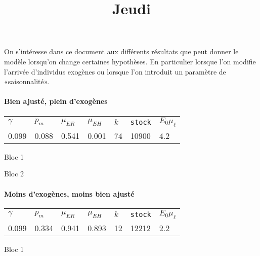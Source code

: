 \documentclass[a4paper, 11pt]{article}
\title{Jeudi}
\author{}
\date{}
\begin{document}
 \maketitle 
 
 On s'intéresse dans ce document aux différents résultats que peut donner le modèle lorsqu'on change certaines hypothèses.
 En particulier lorsque l'on modifie l'arrivée d'individus exogènes ou lorsque l'on introduit un paramètre de «saisonnalité».
 
 \paragraph{Bien ajusté, plein d'exogènes}
 
 \begin{center}
\begin{tabular}{lllllll}
$\gamma$ & $p_m$ & $\mu_{ER}$ & $\mu_{EH}$ & $k$ & \texttt{stock} & $E_0 \mu_{\ell}$\\
0.099 & 0.088 & 0.541 & 0.001 & 74 & 10900 & 4.2
 \end{tabular}
 \end{center}

 Bloc 1
 \begin{figure}[ht]
 \centering
{}
\end{figure}

Bloc 2
 \begin{figure}[ht]
 \centering
{}
\end{figure}


 \clearpage
 \paragraph{Moins d'exogènes, moins bien ajusté}
  \begin{center}
\begin{tabular}{lllllll}
$\gamma$ & $p_m$ & $\mu_{ER}$ & $\mu_{EH}$ & $k$ & \texttt{stock} & $E_0 \mu_{\ell}$\\
0.099 & 0.334 & 0.941 & 0.893 & 12 & 12212 & 2.2
 \end{tabular}
 \end{center}
 
 Bloc 1
  \begin{figure}[ht]
 \centering
{}
\end{figure}
 
\end{document}
